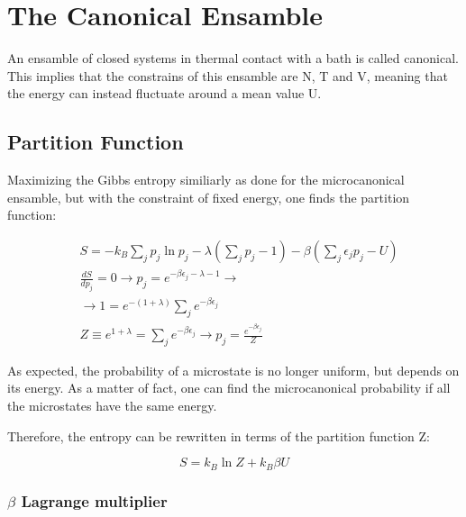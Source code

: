 \documentclass{article}
\begin{document}
\newpage

\section{The Canonical Ensamble}

An ensamble of closed systems in thermal contact with a bath is called canonical.
This implies that the constrains of this ensamble are N, T and V, meaning that the
energy can instead fluctuate around a mean value U.

\subsection{Partition Function}

Maximizing the Gibbs entropy similiarly as done for the microcanonical ensamble, but with the constraint of fixed energy, one finds the partition function:

\begin{equation}
    \begin{aligned}
         & S= -k_B\sum_{j}p_j\ln{p_j}-\lambda\left(\sum_{j}p_j-1\right)-\beta\left(\sum_{j}\epsilon_jp_j-U\right) \\
         & \frac{dS}{dp_j}=0 \rightarrow p_j=e^{-\beta\epsilon_j-\lambda-1} \rightarrow                           \\
         & \rightarrow 1=e^{-(1+\lambda)}\sum_{j}e^{-\beta\epsilon_j}                                             \\
         & Z\equiv e^{1+\lambda}=\sum_{j}e^{-\beta\epsilon_j} \rightarrow p_j=\frac{e^{-\beta\epsilon_j}}{Z}
    \end{aligned}
\end{equation}

As expected, the probability of a microstate is no longer uniform, but depends on its energy.
As a matter of fact, one can find the microcanonical probability if all the microstates have the same energy.

Therefore, the entropy can be rewritten in terms of the partition function Z:

\begin{equation}
    S=k_B\ln{Z}+k_B\beta U
\end{equation}

\subsubsection{$\beta$ Lagrange multiplier}
\end{document}
